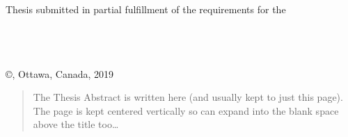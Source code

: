 \documentclass[
12pt, %
oneside, %
english, %
draft=false,
doublespacing, %
liststotoc, %
toctotoc, %
parskip, %
headsepline, %
]{MastersDoctoralThesis} %
\author{Sean Louis Alan \textsc{Floyd}} %
\begin{document}
\frontmatter %

\pagestyle{plain} %


\begin{titlepage}
\begin{center}

\vspace*{.05\textheight}

\HRule \\[0.4cm] %
{\huge \bfseries \ttitle\par}\vspace{0.4cm} %
\HRule \\[1.5cm] %
 
\large \authorname %
 
\vfill

Thesis submitted in partial fulfillment of the requirements for the \\
\textbf{\degreename}\\[0.3cm] %
\deptname\\\univname{}\\[2cm] %
 
\vfill

{\copyright \authorname, Ottawa, Canada, 2019}\\[4cm] %
\end{center}
\end{titlepage}

\cleardoublepage


\begin{abstract}
\addchaptertocentry{\abstractname} %
The Thesis Abstract is written here (and usually kept to just this page). The page is kept centered vertically so can expand into the blank space above the title too\ldots
\end{abstract}
\end{document}
